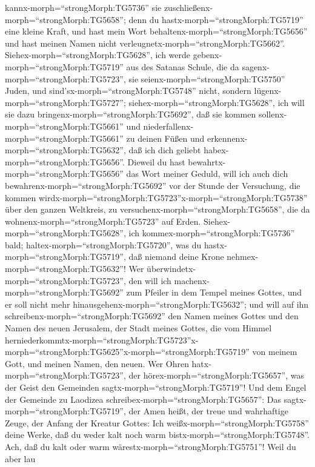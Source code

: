 kannx-morph=``strongMorph:TG5736'' sie
zuschließenx-morph=``strongMorph:TG5658''; denn du
hastx-morph=``strongMorph:TG5719'' eine kleine Kraft, und hast mein Wort
behaltenx-morph=``strongMorph:TG5656'' und hast meinen Namen nicht
verleugnetx-morph=``strongMorph:TG5662''. 
Siehex-morph=``strongMorph:TG5628'', ich werde
gebenx-morph=``strongMorph:TG5719'' aus des Satanas Schule, die da
sagenx-morph=``strongMorph:TG5723'', sie
seienx-morph=``strongMorph:TG5750'' Juden, und
sind'sx-morph=``strongMorph:TG5748'' nicht, sondern
lügenx-morph=``strongMorph:TG5727'';
siehex-morph=``strongMorph:TG5628'', ich will sie dazu
bringenx-morph=``strongMorph:TG5692'', daß sie kommen
sollenx-morph=``strongMorph:TG5661'' und
niederfallenx-morph=``strongMorph:TG5661'' zu deinen Füßen und
erkennenx-morph=``strongMorph:TG5632'', daß ich dich geliebt
habex-morph=``strongMorph:TG5656''.  Dieweil du hast
bewahrtx-morph=``strongMorph:TG5656'' das Wort meiner Geduld, will ich
auch dich bewahrenx-morph=``strongMorph:TG5692'' vor der Stunde der
Versuchung, die kommen
wirdx-morph=``strongMorph:TG5723''x-morph=``strongMorph:TG5738'' über
den ganzen Weltkreis, zu versuchenx-morph=``strongMorph:TG5658'', die da
wohnenx-morph=``strongMorph:TG5723'' auf Erden. 
Siehex-morph=``strongMorph:TG5628'', ich
kommex-morph=``strongMorph:TG5736'' bald;
haltex-morph=``strongMorph:TG5720'', was du
hastx-morph=``strongMorph:TG5719'', daß niemand deine Krone
nehmex-morph=``strongMorph:TG5632''!  Wer
überwindetx-morph=``strongMorph:TG5723'', den will ich
machenx-morph=``strongMorph:TG5692'' zum Pfeiler in dem Tempel meines
Gottes, und er soll nicht mehr
hinausgehenx-morph=``strongMorph:TG5632''; und will auf ihn
schreibenx-morph=``strongMorph:TG5692'' den Namen meines Gottes und den
Namen des neuen Jerusalem, der Stadt meines Gottes, die vom Himmel
herniederkommtx-morph=``strongMorph:TG5723''\textbar x-morph=``strongMorph:TG5625''x-morph=``strongMorph:TG5719''
von meinem Gott, und meinen Namen, den neuen.  Wer Ohren
hatx-morph=``strongMorph:TG5723'', der
hörex-morph=``strongMorph:TG5657'', was der Geist den Gemeinden
sagtx-morph=``strongMorph:TG5719''!  Und dem Engel der
Gemeinde zu Laodizea schreibex-morph=``strongMorph:TG5657'': Das
sagtx-morph=``strongMorph:TG5719'', der Amen heißt, der treue und
wahrhaftige Zeuge, der Anfang der Kreatur Gottes:  Ich
weißx-morph=``strongMorph:TG5758'' deine Werke, daß du weder kalt noch
warm bistx-morph=``strongMorph:TG5748''. Ach, daß du kalt oder warm
wärestx-morph=``strongMorph:TG5751''!  Weil du aber lau
